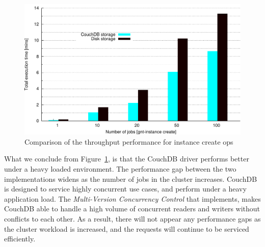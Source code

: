 \begin{figure}[htbp]
  \begin{center}
    \includegraphics[width=1.0\maxwidth]{../figures/total_secs.pdf}
    \caption{Comparison of the throughput performance for instance create ops}
    \label{fig:total_secs}
  \end{center}
\end{figure}

What we conclude from Figure~\ref{fig:total_secs}, is that the CouchDB driver
performs better under a heavy loaded environment. The performance gap between
the two implementations widens as the number of jobs in the cluster increases.
CouchDB is designed to service highly concurrent use cases, and perform under a
heavy application load. The \emph{Multi-Version Concurrency Control} that
implements, makes CouchDB able to handle a high volume of concurrent readers and
writers without conflicts to each other. As a result, there will not appear any
performance gaps as the cluster workload is increased, and the requests will
continue to be serviced efficiently.
